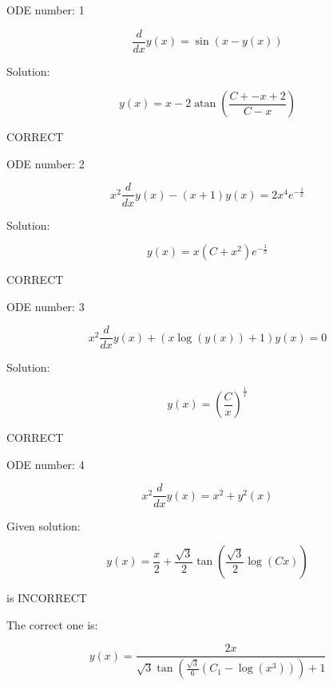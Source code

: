 \documentclass{article}
\begin{document}
        
ODE number: 1

$$
 \frac{d}{d x} y{\left (x \right )} = \sin{\left (x - y{\left (x \right )} \right )} 
$$

Solution:

$$
 y{\left (x \right )} = x - 2 \operatorname{atan}{\left (\frac{C + - x + 2}{C - x} \right )} 
$$

CORRECT

ODE number: 2

$$
 x^{2} \frac{d}{d x} y{\left (x \right )} - \left(x + 1\right) y{\left (x \right )} = 2 x^{4} e^{- \frac{1}{x}} 
$$

Solution:

$$
 y{\left (x \right )} = x \left(C + x^{2}\right) e^{- \frac{1}{x}} 
$$

CORRECT

ODE number: 3

$$
 x^{2} \frac{d}{d x} y{\left (x \right )} + \left(x \log{\left (y{\left (x \right )} \right )} + 1\right) y{\left (x \right )} = 0 
$$

Solution:

$$
 y{\left (x \right )} = \left(\frac{C}{x}\right)^{\frac{1}{x}} 
$$

CORRECT

ODE number: 4

$$
 x^{2} \frac{d}{d x} y{\left (x \right )} = x^{2} + y^{2}{\left (x \right )} 
$$

Given solution:

$$
 y{\left (x \right )} = \frac{x}{2} + \frac{\sqrt{3}}{2} \tan{\left (\frac{\sqrt{3}}{2} \log{\left (C x \right )} \right )} 
$$

 is INCORRECT

The correct one is:

$$
 y{\left (x \right )} = \frac{2 x}{\sqrt{3} \tan{\left (\frac{\sqrt{3}}{6} \left(C_{1} - \log{\left (x^{3} \right )}\right) \right )} + 1} 
$$
\end{document}
